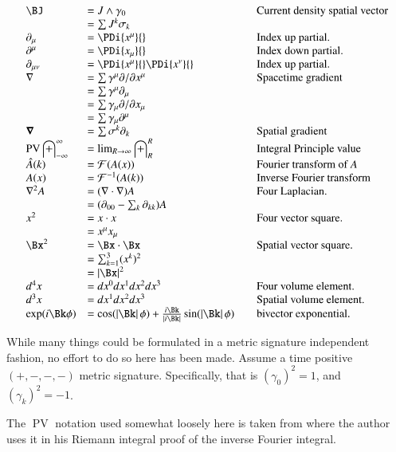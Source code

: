 \documentclass{article}
\DeclareMathOperator{\PV}{PV}
\newcommand{\FF}[0]{\mathcal{F}}
\newcommand{\IIinf}[0]{ \int_{-\infty}^\infty }
\begin{document}
\begin{equation*}
\begin{array}{l l l}
\BJ &= J \wedge \gamma_0 & \quad \mbox{Current density spatial vector} \\
    &= \sum J^k \sigma_k \\
\partial_{\mu} &= \PDi{x^\mu}{} & \quad \mbox{Index up partial.} \\
\partial^{\mu} &= \PDi{x_\mu}{} & \quad \mbox{Index down partial.} \\
\partial_{\mu\nu} &= \PDi{x^\mu}{}\PDi{x^\nu}{} & \quad \mbox{Index up partial.} \\
\grad &= \sum \gamma^{\mu} \partial/\partial {x^{\mu}} & \quad \mbox{Spacetime gradient} \\
      &= \sum \gamma^{\mu}\partial_{\mu} \\
      &= \sum \gamma_{\mu} \partial/\partial {x_{\mu}} \\
      &= \sum \gamma_{\mu}\partial^{\mu} \\
\spacegrad &= \sum \sigma^{k} \partial_k & \quad \mbox{Spatial gradient} \\
\PV \IIinf &= \lim_{R\rightarrow \infty} \int_{R}^R & \quad \mbox{Integral Principle value} \\
\hat{A}(k) &= \FF(A(x)) & \quad \mbox{Fourier transform of $A$} \\ 
{A}(x) &= \FF^{-1}(A(k)) & \quad \mbox{Inverse Fourier transform} \\ 
\grad^2 A
   &= (\grad \cdot \grad) A & \quad \mbox{Four Laplacian. } \\
   &= (\partial_{00} - \sum_k \partial_{kk}) A & \\
x^2 &= x \cdot x & \quad \mbox{Four vector square. } \\
    &= x^\mu x_\mu \\
\Bx^2 &= \Bx \cdot \Bx & \quad \mbox{Spatial vector square. } \\
    &= \sum_{k=1}^3 (x^k)^2 \\
    &= \Abs{\Bx}^2 \\
d^4 x &= dx^0 dx^1 dx^2 dx^3 & \quad \mbox{Four volume element. } \\
d^3 x &= dx^1 dx^2 dx^3 & \quad \mbox{Spatial volume element. } \\
\exp(i\Bk\phi) &= 
\cos(\Abs{\Bk}\phi) + \frac{i \Bk}{\Abs{i\Bk}} \sin(\Abs{\Bk}\phi) & \quad \mbox{bivector exponential. } \\
\end{array}
\end{equation*}

While many things could be formulated in a metric signature independent fashion, no effort to do so here has been made.  Assume
a time positive
$(+,-,-,-)$
metric signature.  Specifically, that is $(\gamma_0)^2 = 1$, and $(\gamma_k)^2 = -1$.  

The $\PV$ notation used somewhat loosely here is taken from \cite{lepage1980cva} where the author uses it in his Riemann integral proof of the inverse Fourier integral.



\end{document}
